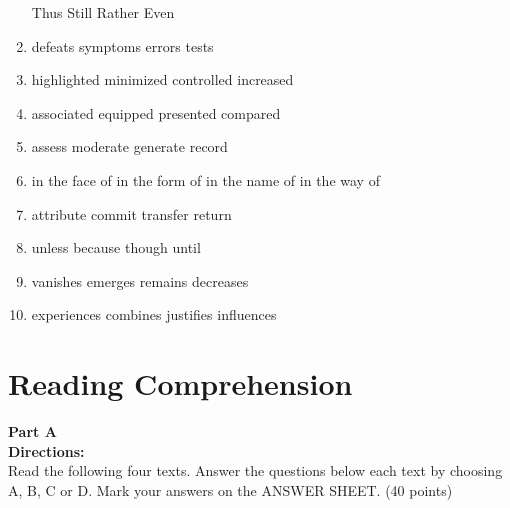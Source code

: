 \begin{enumerate}
\fourchoices
{Thus}
{Still}
{Rather}
{Even}




\item


\fourchoices
{defeats}
{symptoms}
{errors}
{tests}




\item

\fourchoices
{highlighted}
{minimized}
{controlled}
{increased}



\item

\fourchoices
{associated}
{equipped}
{presented}
{compared}


\item


\fourchoices
{assess}
{moderate}
{generate}
{record}




\item

\fourchoices
{in the face of}
{in the form of}
{in the name of}
{in the way of}


\item


\fourchoices
{attribute}
{commit}
{transfer}
{return}




\item


\fourchoices
{unless}
{because}
{though}
{until}




\item


\fourchoices
{vanishes}
{emerges}
{remains}
{decreases}




\item

\fourchoices
{experiences}
{combines}
{justifies}
{influences}



\end{enumerate}


\hfill

\section{Reading Comprehension}


\noindent
\textbf{Part A}\\
\textbf{Directions:}\\
Read the following four texts. Answer the questions below each text by
choosing A, B, C or
D. Mark your answers on the ANSWER SHEET. (40 points)

